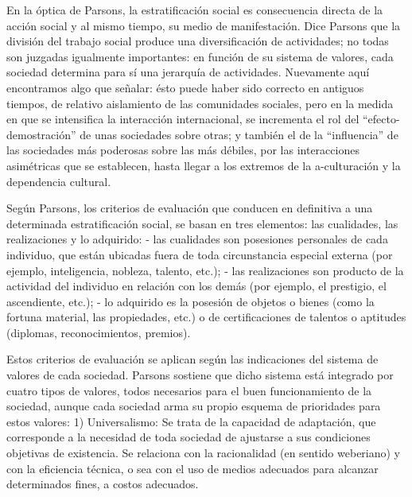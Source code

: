 \documentclass[
]{book}
\begin{document}
En la óptica de Parsons, la estratificación social es consecuencia directa de la acción social y al mismo tiempo, su medio de manifestación. Dice Parsons que la división del trabajo social produce una diversificación de actividades; no todas son juzgadas igualmente importantes: en función de su sistema de valores, cada sociedad determina para sí una jerarquía de actividades. Nuevamente aquí encontramos algo que señalar: ésto puede haber sido correcto en antiguos tiempos, de relativo aislamiento de las comunidades sociales, pero en la medida en que se intensifica la interacción internacional, se incrementa el rol del ``efecto-demostración'' de unas sociedades sobre otras; y también el de la ``influencia'' de las sociedades más poderosas sobre las más débiles, por las interacciones asimétricas que se establecen, hasta llegar a los extremos de la a-culturación y la dependencia cultural.

Según Parsons, los criterios de evaluación que conducen en definitiva a una determinada estratificación social, se basan en tres elementos: las cualidades, las realizaciones y lo adquirido: - las cualidades son posesiones personales de cada individuo, que están ubicadas fuera de toda circunstancia especial externa (por ejemplo, inteligencia, nobleza, talento, etc.); - las realizaciones son producto de la actividad del individuo en relación con los demás (por ejemplo, el prestigio, el ascendiente, etc.); - lo adquirido es la posesión de objetos o bienes (como la fortuna material, las propiedades, etc.) o de certificaciones de talentos o aptitudes (diplomas, reconocimientos, premios).

Estos criterios de evaluación se aplican según las indicaciones del sistema de valores de cada sociedad. Parsons sostiene que dicho sistema está integrado por cuatro tipos de valores, todos necesarios para el buen funcionamiento de la sociedad, aunque cada sociedad arma su propio esquema de prioridades para estos valores: 1) Universalismo: Se trata de la capacidad de adaptación, que corresponde a la necesidad de toda sociedad de ajustarse a sus condiciones objetivas de existencia. Se relaciona con la racionalidad (en sentido weberiano) y con la eficiencia técnica, o sea con el uso de medios adecuados para alcanzar determinados fines, a costos adecuados.
\end{document}
